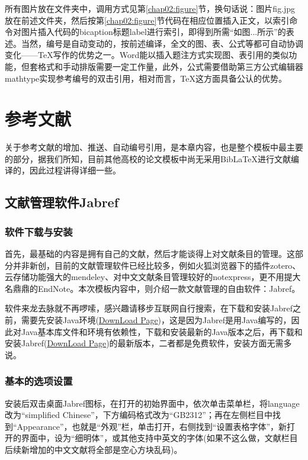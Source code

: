 所有图片放在文件夹中，调用方式见第\ref{chap02:figure}节，换句话说：图片fig.jpg放在前述文件夹，然后按第\ref{chap02:figure}节代码在相应位置插入正文，以索引命令对图片插入代码的bicaption标题label进行索引，即得到所需“如图...所示”的表述。当然，编号是自动变动的，按前述编译，全文的图、表、公式等都可自动协调变化——\TeX{}写作的优势之一。Word能以插入题注方式实现图、表引用的类似功能，但套格式和手动排版需要一定工作量，此外，公式需要借助第三方公式编辑器mathtype实现参考编号的双击引用，相对而言，\TeX{}这方面具备公认的优势。

\section{参考文献}
关于参考文献的增加、推送、自动编号引用，是本章内容，也是整个模板中最主要的部分，据我们所知，目前其他高校的论文模板中尚无采用Bib\LaTeX{}进行文献编译的，因此过程讲得详细一些。
\subsection{文献管理软件Jabref}
\subsubsection{软件下载与安装}
首先，最基础的内容是拥有自己的文献，然后才能谈得上对文献条目的管理。这部分并非新创，目前的文献管理软件已经比较多，例如火狐浏览器下的插件zotero、云存储功能强大的mendeley、对中文文献条目管理较好的notexpress，更不用提大名鼎鼎的EndNote。本次模板内容中，则介绍一款文献管理的自由软件：Jabref。

软件来龙去脉就不再啰嗦，感兴趣请移步互联网自行搜索，在下载和安装Jabref之前，需要先安装Java环境(\href{https://www.java.com/zh_CN/download/chrome.jsp}{DownLoad Page})，这是因为Jabref是用Java编写的，因此对Java基本库文件和环境有依赖性，下载和安装最新的Java版本之后，再下载和安装Jabref(\href{https://www.fosshub.com/JabRef.html}{DownLoad Page})的最新版本，二者都是免费软件，安装方面无需多说。
\subsubsection{基本的选项设置}
安装后双击桌面Jabref图标，在打开的初始界面中，依次单击菜单栏，将language改为“simplified Chinese”，下方编码格式改为“GB2312”；再在左侧栏目中找到“Appearance”，也就是“外观”栏，单击打开，右侧找到“设置表格字体”，新打开的界面中，设为“细明体”，或其他支持中英文的字体(如果不这么做，文献栏目后续新增加的中文文献将全部是空心方块乱码)。

